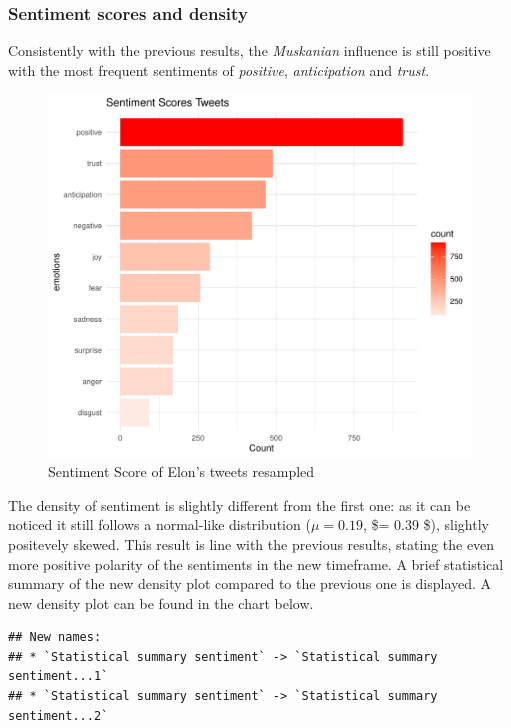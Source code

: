 \documentclass[
]{article}
\begin{document}
\hypertarget{sentiment-scores-and-density-1}{%
\subsubsection{Sentiment scores and
density}\label{sentiment-scores-and-density-1}}

Consistently with the previous results, the \emph{Muskanian} influence
is still positive with the most frequent sentiments of \emph{positive},
\emph{anticipation} and \emph{trust}.

\begin{figure}
\centering
\includegraphics{Trial1_files/figure-latex/fig11-1.pdf}
\caption{\label{fig:fig11}Sentiment Score of Elon's tweets resampled}
\end{figure}

The density of sentiment is slightly different from the first one: as it
can be noticed it still follows a normal-like distribution
(\(\mu = 0.19\), \$\sigma = 0.39 \$), slightly positevely skewed. This
result is line with the previous results, stating the even more positive
polarity of the sentiments in the new timeframe. A brief statistical
summary of the new density plot compared to the previous one is
displayed. A new density plot can be found in the chart below.

\begin{verbatim}
## New names:
## * `Statistical summary sentiment` -> `Statistical summary sentiment...1`
## * `Statistical summary sentiment` -> `Statistical summary sentiment...2`
\end{verbatim}
\end{document}
